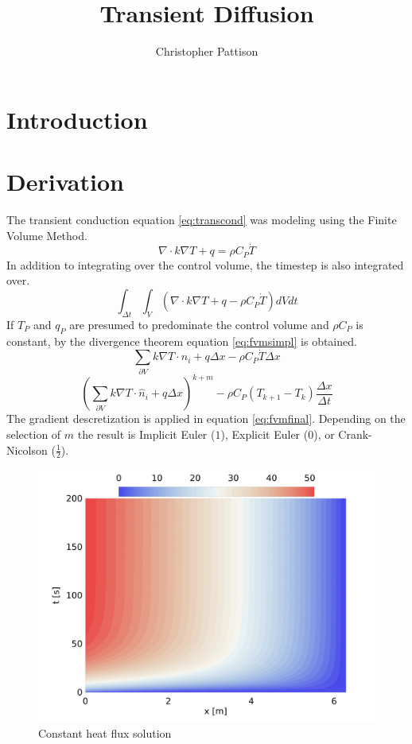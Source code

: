 \documentclass[12pt,twocolumn]{article}
\title{\vspace{-2.5em}Transient Diffusion}
\author{Christopher Pattison}
\date{}
\begin{document}
\maketitle
\section*{Introduction}

\section*{Derivation}
The transient conduction equation \eqref{eq:transcond} was modeling using the Finite Volume Method.
\begin{equation}\label{eq:transcond}\nabla\cdot k\nabla T + q = \rho C_P\dot T\end{equation}
In addition to integrating over the control volume, the timestep is also integrated over.
\begin{equation}\label{eq:fvmtranscond}\int_{\Delta t}\int_V( \nabla\cdot k\nabla T + q - \rho C_P\dot T)dVdt\end{equation}
If $T_P$ and $q_P$ are presumed to predominate the control volume and $\rho C_P$ is constant, by the divergence theorem equation \eqref{eq:fvmsimpl} is obtained.
\begin{equation}\label{eq:fvmsimpl}\sum\limits_{\partial V} k\nabla T \cdot \hat n_i + q \Delta x - \rho C_P \dot T \Delta x\end{equation}
\begin{equation}\label{eq:fvmfinal}\left(\sum\limits_{\partial V} k\nabla T \cdot \hat n_i + q \Delta x\right)^{k+m} - \rho C_P (T_{k+1} - T_k) \frac{\Delta x}{\Delta t}\end{equation}
The gradient descretization is applied in equation \eqref{eq:fvmfinal}. 
Depending on the selection of $m$ the result is Implicit Euler ($1$), Explicit Euler ($0$), or Crank-Nicolson ($\frac{1}{2}$).

\begin{figure}
\includegraphics[width=\columnwidth]{plot/sol.png}
\footnotesize{\caption{Constant heat flux solution}}
\end{figure}
\end{document}
